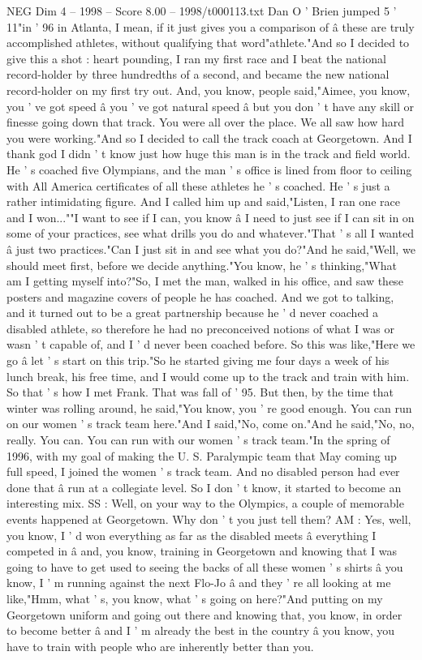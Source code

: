 \begin{textsample}{NEG Dim 4 – 1998 – Score 8.00 – 1998/t000113.txt}
Dan O ' Brien jumped 5 ' 11"in ' 96 in Atlanta, I mean, if it just gives you a comparison of â these are truly accomplished athletes, without qualifying that word"athlete."And so I decided to give this a shot : heart pounding, I ran my first race and I beat the national record-holder by three hundredths of a second, and became the new national record-holder on my first try out.
And, you know, people said,"Aimee, you know, you ' ve got speed â you ' ve got natural speed â but you don ' t have any skill or finesse going down that track.
You were all over the place.
We all saw how hard you were working."And so I decided to call the track coach at Georgetown.
And I thank god I didn ' t know just how huge this man is in the track and field world.
He ' s coached five Olympians, and the man ' s office is lined from floor to ceiling with All America certificates of all these athletes he ' s coached.
He ' s just a rather intimidating figure.
And I called him up and said,"Listen, I ran one race and I won...""I want to see if I can, you know â I need to just see if I can sit in on some of your practices, see what drills you do and whatever."That ' s all I wanted â just two practices."Can I just sit in and see what you do?"And he said,"Well, we should meet first, before we decide anything."You know, he ' s thinking,"What am I getting myself into?"So, I met the man, walked in his office, and saw these posters and magazine covers of people he has coached.
And we got to talking, and it turned out to be a great partnership because he ' d never coached a disabled athlete, so therefore he had no preconceived notions of what I was or wasn ' t capable of, and I ' d never been coached before.
So this was like,"Here we go â let ' s start on this trip."So he started giving me four days a week of his lunch break, his free time, and I would come up to the track and train with him.
So that ' s how I met Frank.
That was fall of ' 95.
But then, by the time that winter was rolling around, he said,"You know, you ' re good enough.
You can run on our women ' s track team here."And I said,"No, come on."And he said,"No, no, really.
You can.
You can run with our women ' s track team."In the spring of 1996, with my goal of making the U.
S.
Paralympic team that May coming up full speed, I joined the women ' s track team.
And no disabled person had ever done that â run at a collegiate level.
So I don ' t know, it started to become an interesting mix.
SS : Well, on your way to the Olympics, a couple of memorable events happened at Georgetown.
Why don ' t you just tell them?
AM : Yes, well, you know, I ' d won everything as far as the disabled meets â everything I competed in â and, you know, training in Georgetown and knowing that I was going to have to get used to seeing the backs of all these women ' s shirts â you know, I ' m running against the next Flo-Jo â and they ' re all looking at me like,"Hmm, what ' s, you know, what ' s going on here?"And putting on my Georgetown uniform and going out there and knowing that, you know, in order to become better â and I ' m already the best in the country â you know, you have to train with people who are inherently better than you.

\end{textsample}
